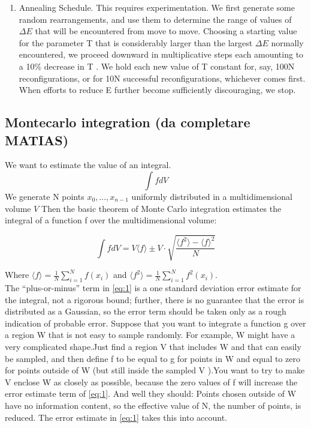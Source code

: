 \begin{enumerate}
\item Annealing Schedule. This requires experimentation. We first generate some random rearrangements, and use them to determine the range of values of $\Delta E$ that will be encountered from move to move. Choosing a starting value for the parameter T that is considerably larger than the largest $\Delta E$ normally encountered, we proceed downward in multiplicative steps each amounting to a 10\% decrease in T . We hold each new value of T constant for, say, 100N reconfigurations, or for 10N successful reconfigurations, whichever comes first. When efforts to reduce E further become sufficiently discouraging, we stop.
\end{enumerate}

\subsection{Montecarlo integration (da completare MATIAS)}

We want to estimate the value of an integral.
\[\int f dV\]
We generate N points ${x_{0},\dots,x_{n-1}}$ uniformly distributed in a multidimensional volume $V$ Then the basic theorem of Monte Carlo integration estimates the integral of a function f over the multidimensional volume: 

\begin{equation}
\label{eq:2}
\int f dV= V \langle f \rangle  \pm V\cdot \sqrt{\frac{\langle f^2 \rangle - \langle f  \rangle^2}{N}}
\end{equation}

Where $\langle f \rangle = \frac{1}{N}\sum_{i=1}^{N}f(x_{i})$ and 
$\langle f^2 \rangle = \frac{1}{N}\sum_{i=1}^{N}f^2(x_{i}).$\\

The “plus-or-minus” term in \ref{eq:1} is a one standard deviation error estimate for the integral, not a rigorous bound; further, there is no guarantee that the error is distributed as a Gaussian, so the error term should be taken only as a rough indication of probable error.
Suppose that you want to integrate a function g over a region W that is not easy to sample randomly.
For example, W might have a very complicated shape.Just find a region V that includes W and that can easily be sampled, and then define f to be equal to g for points in W and equal to zero for points outside of W (but still inside the sampled V ).You want to try to make V enclose W as closely as possible, because the zero values of f will increase the error estimate term of \ref{eq:1}. And well they should: Points chosen outside of W have no information content, so the effective value of N, the number of points, is reduced. The error estimate in \ref{eq:1} takes this into account.

